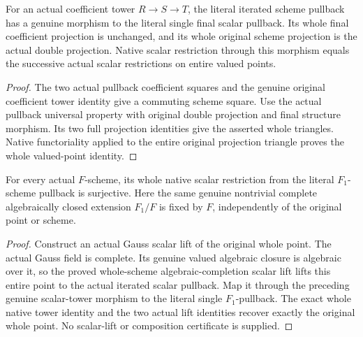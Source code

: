 \begin{lemma}
\label{lem:fc-scheme-scalar-tower-map}
\leanok
{}
For an actual coefficient tower $R\to S\to T$, the literal iterated
scheme pullback has a genuine morphism to the literal single final
scalar pullback. Its whole final coefficient projection is unchanged,
and its whole original scheme projection is the actual double
projection. Native scalar restriction through this morphism equals the
successive actual scalar restrictions on entire valued points.
\end{lemma}
\begin{proof}
The two actual pullback coefficient squares and the genuine original
coefficient tower identity give a commuting scheme square. Use the
actual pullback universal property with original double projection and
final structure morphism. Its two full projection identities give the
asserted whole triangles. Native functoriality applied to the entire
original projection triangle proves the whole valued-point identity.
\end{proof}

\begin{lemma}
\label{lem:fc-scheme-nontrivial-complete-scalar-lift}
\leanok
{}
For every actual $F$-scheme, its whole native scalar restriction from
the literal $F_1$-scheme pullback is surjective. Here the same genuine
nontrivial complete algebraically closed extension $F_1/F$ is fixed by
$F$, independently of the original point or scheme.
\end{lemma}
\begin{proof}
Construct an actual Gauss scalar lift of the original whole point.
The actual Gauss field is complete. Its genuine valued algebraic
closure is algebraic over it, so the proved whole-scheme
algebraic-completion scalar lift lifts this entire point to the actual
iterated scalar pullback. Map it through the preceding genuine
scalar-tower morphism to the literal single $F_1$-pullback. The exact
whole native tower identity and the two actual lift identities recover
exactly the original whole point. No scalar-lift or composition
certificate is supplied.
\end{proof}
